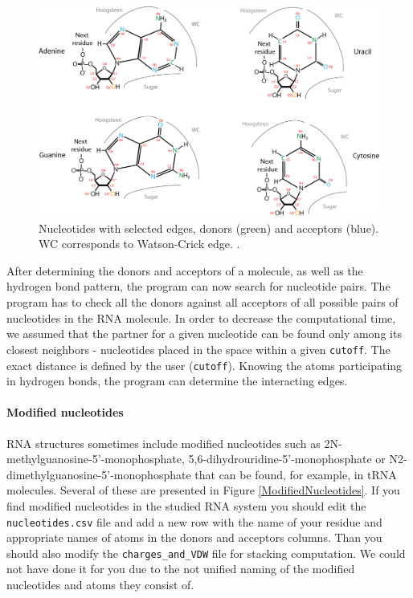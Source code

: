 \documentclass[12pt]{article}
\begin{document}
\begin{figure}[h!]
\centering
\includegraphics[width = 14cm]{./pictures/donors_acceptors_nucleotides.png}
\caption{Nucleotides with selected edges, donors (green) and acceptors (blue). WC corresponds to Watson-Crick edge.  \cite{Lescoute2006}.}
\label{Edges}
\end{figure}

After determining the donors and acceptors of a molecule, as well as the hydrogen bond pattern, the program can now search for nucleotide pairs. The program has to check all the donors against all acceptors of all possible pairs of nucleotides in the RNA molecule. In order to decrease the computational time, we assumed that the partner for a given nucleotide can be found only among its closest neighbors - nucleotides placed in the space within a given \texttt{cutoff}. The exact distance is defined by the user (\texttt{cutoff}). Knowing the atoms participating in hydrogen bonds, the program can determine the interacting edges.

\paragraph{Modified nucleotides}
RNA structures sometimes include modified nucleotides such as 2N-methylguanosine-5'-monophosphate, 5,6-dihydrouridine-5'-monophosphate or N2-dimethylguanosine-5'-monophosphate that can be found, for example, in tRNA molecules. Several of these are presented in Figure \ref{ModifiedNucleotides}. If you find modified nucleotides in the studied RNA system you should edit the \texttt{nucleotides.csv} file and add  a new row with the name of your residue and appropriate names of atoms in the donors and acceptors columns. Than you should also modify the \texttt{charges\_and\_VDW} file for stacking computation. We could not have done it for you due to the not unified naming of the modified nucleotides and atoms they consist of. 
\end{document}
